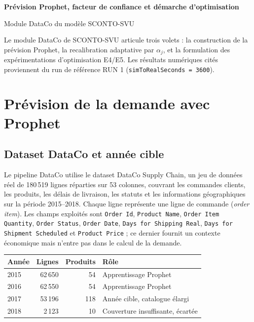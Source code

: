 \documentclass[11pt,a4paper]{article}
\newcommand{\code}[1]{\texttt{#1}}
\begin{document}
\begin{center}
{\Large\bfseries\color{cpblue} Prévision Prophet, facteur de confiance et démarche d'optimisation\par}
\vspace{0.2cm}
{\normalsize Module DataCo du modèle SCONTO-SVU\par}
\end{center}
\vspace{0.3cm}

\noindent Le module DataCo de SCONTO-SVU articule trois volets : la construction de la prévision Prophet, la recalibration adaptative par $\alpha_j$, et la formulation des expérimentations d'optimisation E4/E5. Les résultats numériques cités proviennent du run de référence RUN 1 (\code{simToRealSeconds = 3600}).

\section{Prévision de la demande avec Prophet}

\subsection{Dataset DataCo et année cible}

Le pipeline DataCo utilise le dataset DataCo Supply Chain, un jeu de données réel de 180\,519 lignes réparties sur 53 colonnes, couvrant les commandes clients, les produits, les délais de livraison, les statuts et les informations géographiques sur la période 2015--2018. Chaque ligne représente une ligne de commande (\emph{order item}). Les champs exploités sont \code{Order Id}, \code{Product Name}, \code{Order Item Quantity}, \code{Order Status}, \code{Order Date}, \code{Days for Shipping Real}, \code{Days for Shipment Scheduled} et \code{Product Price} ; ce dernier fournit un contexte économique mais n'entre pas dans le calcul de la demande.

\begin{center}
\small
\begin{tabular}{lrrl}
\toprule
Année & Lignes & Produits & Rôle \\
\midrule
2015 & 62\,650 & 54 & Apprentissage Prophet \\
2016 & 62\,550 & 54 & Apprentissage Prophet \\
2017 & 53\,196 & 118 & Année cible, catalogue élargi \\
2018 & 2\,123 & 10 & Couverture insuffisante, écartée \\
\bottomrule
\end{tabular}
\end{center}
\end{document}
